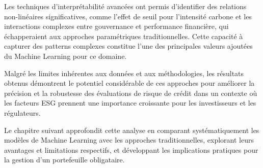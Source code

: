 Les techniques d'interprétabilité avancées ont permis d'identifier des relations non-linéaires significatives, comme l'effet de seuil pour l'intensité carbone et les interactions complexes entre gouvernance et performance financière, qui échapperaient aux approches paramétriques traditionnelles. Cette capacité à capturer des patterns complexes constitue l'une des principales valeurs ajoutées du Machine Learning pour ce domaine.

Malgré les limites inhérentes aux données et aux méthodologies, les résultats obtenus démontrent le potentiel considérable de ces approches pour améliorer la précision et la robustesse des évaluations de risque de crédit dans un contexte où les facteurs ESG prennent une importance croissante pour les investisseurs et les régulateurs.

Le chapitre suivant approfondit cette analyse en comparant systématiquement les modèles de Machine Learning avec les approches traditionnelles, explorant leurs avantages et limitations respectifs, et développant les implications pratiques pour la gestion d'un portefeuille obligataire.